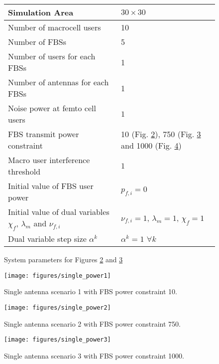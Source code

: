 \begin{center}
\begin{figure}[H]
\begin{tabular}{ | m{8cm} | m{5cm} | } 
\hline
Simulation Area & $30 \times 30$\\ 
\hline
Number of macrocell users & 10\\ 
\hline
Number of FBSs & 5\\ 
\hline
Number of users for each FBSs & 1\\ 
\hline
Number of antennas for each FBSs & 1\\ 
\hline
Noise power at femto cell users & $1$\\ 
\hline
FBS transmit power constraint & 10 (Fig. \ref{single_power1}), 750 (Fig. \ref{single_power2} and 1000 (Fig. \ref{single_power3})  \\ 
\hline
Macro user interference threshold & $1$\\ 
\hline
Initial value of FBS user power & $p_{f,i} = 0$\\
\hline
Initial value of dual variables $\chi_{f}$, $\lambda_{m}$ and $\nu_{f,i}$ & $\nu_{f,i}=1$, $\lambda_{m}=1 $, $\chi_{f}=1$\\
\hline
Dual variable step size $\alpha^k$& $\alpha^k= 1$ $\forall k$\\
\hline
\end{tabular}
\caption{System parameters for Figures \ref{single_power1} and \ref{single_power2}}
\label{table1}
\end{figure}
\end{center}


\begin{figure}[H]
	\texttt{[image: figures/single\_power1]}
	  \caption{Single antenna scenario 1 with FBS power constraint 10.}
	  \label{single_power1}
\end{figure}
\begin{figure}[H]
	\texttt{[image: figures/single\_power2]}
	  \caption{Single antenna scenario 2 with FBS power constraint 750.}
	  \label{single_power2}
\end{figure}
\begin{figure}[H]
	\texttt{[image: figures/single\_power3]}
	  \caption{Single antenna scenario 3 with FBS power constraint 1000.}
	  \label{single_power3}
\end{figure}


